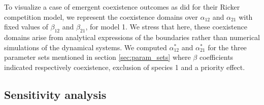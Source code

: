 \documentclass{article}
\begin{document}
To visualize a case of emergent coexistence outcomes as did \citet{moll2008competition} for their Ricker competition model, we represent the coexistence domains over $\alpha_{12}$ and $\alpha_{21}$ with fixed values of $\beta_{12}$ and $\beta_{21}$, for model 1. We stress that here, these coexistence domains arise from analytical expressions of the boundaries rather than numerical simulations of the dynamical systems. We computed $\alpha_{12}^*$ and $\alpha_{21}^*$ for the three parameter sets mentioned in section \ref{sec:param_sets} where $\beta$ coefficients indicated respectively coexistence, exclusion of species 1 and a priority effect. 

\subsection{Sensitivity analysis}
\end{document}
